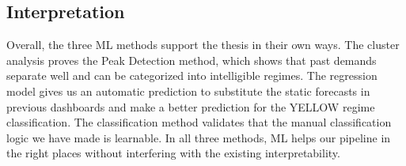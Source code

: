 \subsection{Interpretation}

Overall, the three ML methods support the thesis in their own ways. The cluster analysis proves the Peak Detection method, which shows that past demands separate well and can be categorized into intelligible regimes. The regression model gives us an automatic prediction to substitute the static forecasts in previous dashboards and make a better prediction for the YELLOW regime classification. The classification method validates that the manual classification logic we have made is learnable. In all three methods, ML helps our pipeline in the right places without interfering with the existing interpretability.